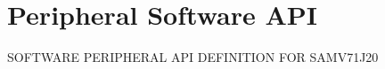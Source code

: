 \hypertarget{group__SAMV71J20__api}{}\section{Peripheral Software A\+PI}
\label{group__SAMV71J20__api}
S\+O\+F\+T\+W\+A\+RE P\+E\+R\+I\+P\+H\+E\+R\+AL A\+PI D\+E\+F\+I\+N\+I\+T\+I\+ON F\+OR S\+A\+M\+V71\+J20 